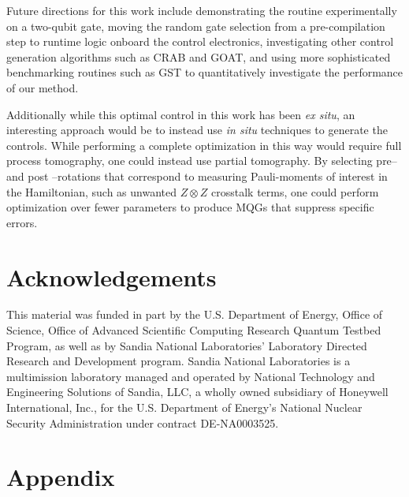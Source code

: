\documentclass[aps,nofootinbib,pra,notitlepage,twocolumn]{revtex4-1}
\newcommand{\0}{\ensuremath{\mathbf{0}}}
\begin{document}
{Future directions for this work include demonstrating the routine experimentally on a two-qubit gate, moving the random gate selection from a pre-compilation step to runtime logic onboard the control electronics, investigating other control generation algorithms such as CRAB \cite{Caneva2011} and GOAT\cite{Machnes2018}, and using more sophisticated benchmarking routines such as GST\cite{BlumeKohout2017} to quantitatively investigate the performance of our method.

Additionally while this optimal control in this work has been \textit{ex situ}, an interesting approach would be to instead use \textit{in situ} techniques \cite{Wu2018, Kelly2014, Ferrie2015} to generate the controls. While performing a complete optimization in this way would require full process tomography, one could instead use partial tomography. By selecting pre-- and post --rotations that correspond to measuring Pauli-moments of interest in the Hamiltonian, such as unwanted $Z\otimes Z$ crosstalk terms, one could perform optimization over fewer parameters to produce MQGs that suppress specific errors.


\section{Acknowledgements}
\label{sec:acknowledgements}
This material was funded in part by the U.S. Department of Energy, Office of Science, Office of Advanced Scientific Computing Research Quantum Testbed Program, as well as by Sandia National Laboratories' Laboratory Directed Research and Development program. Sandia National Laboratories is a multimission laboratory managed and operated by National Technology and Engineering Solutions of Sandia, LLC, a wholly owned subsidiary of Honeywell International, Inc., for the U.S. Department of Energy's National Nuclear Security Administration under contract DE-NA0003525.


\section{Appendix}
\label{sec:appendix}

}
\end{document}
